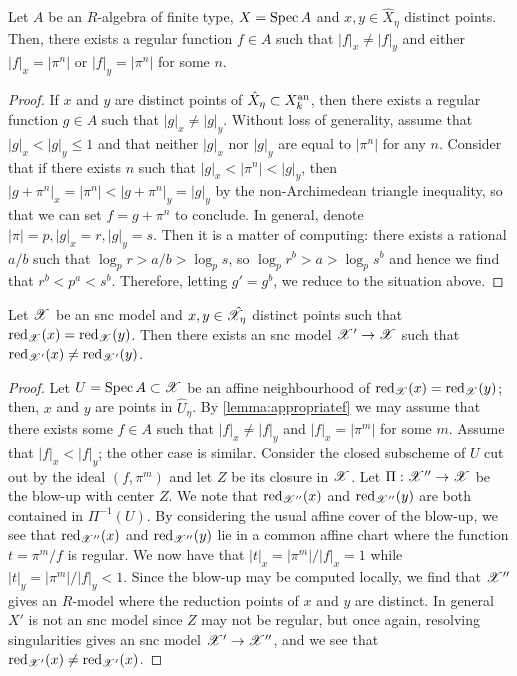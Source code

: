 \begin{lemma} \label{lemma:appropriatef}
    Let $A$ be an $R$-algebra of finite type, $X = \operatorname{Spec} A$ and $x, y \in \hat{X}_{\eta}$ distinct points.
    Then, there exists a regular function $f \in A$ such that $|f|_x \neq |f|_y$ and either $|f|_x = |\pi^n|$ or $|f|_y = |\pi^n|$ for some $n$.
\end{lemma}
\begin{proof}
    If $x$ and $y$ are distinct points of $\hat{X}_{\eta} \subset X_k^{\text{an}}$, then there exists a regular function $g \in A$ such that $|g|_x \neq |g|_y$.
    Without loss of generality, assume that $|g|_x < |g|_y \leq 1$ and that neither $|g|_x$ nor $|g|_y$ are equal to $|\pi^n|$ for any $n$.
    Consider that if there exists $n$ such that $|g|_x < |\pi^n| < |g|_y$, then $|g + \pi^n|_x = |\pi^n| < |g + \pi^n|_y = |g|_y$ by the non-Archimedean triangle inequality, so that we can set $f = g + \pi^n$ to conclude.
    In general, denote $|\pi| = p, |g|_x = r, |g|_y = s$. Then it is a matter of computing: there exists a rational $a/b$ such that $\log_{p} r > a/b > \log_{p} s$, so $\log_{p} r^b > a > \log_{p} s^b$ and hence we find that $r^b < p^a < s^b$.
    Therefore, letting $g' = g^b$, we reduce to the situation above.
\end{proof}

\begin{lemma}\label{redequal}
    Let $\mathscr{X}$ be an snc model and $x, y \in \hat{\mathscr{X}}_{\eta}$ distinct points such that $\operatorname{red}_{\mathscr{X}}(x) = \operatorname{red}_{\mathscr{X}}(y)$. 
    Then there exists an snc model $\mathscr{X}' \to \mathscr{X}$ such that $\operatorname{red}_{\mathscr{X}'}(x) \neq \operatorname{red}_{\mathscr{X}'}(y)$.
\end{lemma}
\begin{proof}
    Let $U = \operatorname{Spec} A \subset \mathscr{X}$ be an affine neighbourhood of $\operatorname{red}_{\mathscr{X}}(x) = \operatorname{red}_{\mathscr{X}}(y)$; then, $x$ and $y$ are points in $\hat{U}_{\eta}$. 
    By \cref{lemma:appropriatef} we may assume that there exists some $f \in A$ such that $|f|_x \neq |f|_y$ and $|f|_x = |\pi^m|$ for some $m$.
    Assume that $|f|_x < |f|_y$; the other case is similar.
    Consider the closed subscheme of $U$ cut out by the ideal $(f, \pi^{m})$ and let $Z$ be its closure in $\mathscr{X}$. Let $\Pi: \mathscr{X}'' \to \mathscr{X}$ be the blow-up with center $Z$.
    We note that $\operatorname{red}_{\mathscr{X}''}(x)$ and $\operatorname{red}_{\mathscr{X}''}(y)$ are both contained in $\Pi^{-1}(U)$. 
    By considering the usual affine cover of the blow-up, we see that $\operatorname{red}_{\mathscr{X}''}(x)$ and $\operatorname{red}_{\mathscr{X}''}(y)$ lie in a common affine chart where the function $t = \pi^m/f$ is regular.
    We now have that $|t|_x = |\pi^{m}|/|f|_x = 1$ while $|t|_y = |\pi^{m}|/|f|_y < 1$. 
    Since the blow-up may be computed locally, we find that $\mathscr{X}''$ gives an $R$-model where the reduction points of $x$ and $y$ are distinct.
    In general $X'$ is not an snc model since $Z$ may not be regular, but once again, resolving singularities gives an snc model $\mathscr{X}' \to \mathscr{X}''$, and we see that $\operatorname{red}_{\mathscr{X}'}(x) \neq \operatorname{red}_{\mathscr{X}'}(x)$.
\end{proof}

